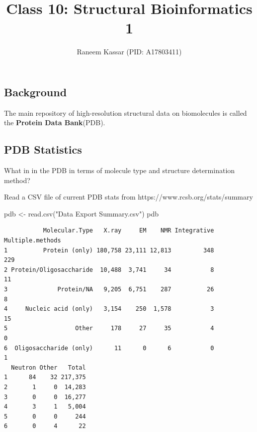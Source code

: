 \documentclass[
  letterpaper,
  DIV=11,
  numbers=noendperiod]{scrartcl}
\title{Class 10: Structural Bioinformatics 1}
\author{Raneem Kassar (PID: A17803411)}
\date{}
\newenvironment{Shaded}{\begin{snugshade}}{\end{snugshade}}
\newcommand{\FunctionTok}[1]{\textcolor[rgb]{0.28,0.35,0.67}{#1}}
\newcommand{\NormalTok}[1]{\textcolor[rgb]{0.00,0.23,0.31}{#1}}
\newcommand{\OtherTok}[1]{\textcolor[rgb]{0.00,0.23,0.31}{#1}}
\newcommand{\SpecialCharTok}[1]{\textcolor[rgb]{0.37,0.37,0.37}{#1}}
\newcommand{\StringTok}[1]{\textcolor[rgb]{0.13,0.47,0.30}{#1}}
\begin{document}
\maketitle


\subsection{Background}\label{background}

The main repository of high-resolution structural data on biomolecules
is called the \textbf{Protein Data Bank}(PDB).

\subsection{PDB Statistics}\label{pdb-statistics}

What in in the PDB in terms of molecule type and structure determination
method?

Read a CSV file of current PDB stats from
https://www.rcsb.org/stats/summary

\begin{Shaded}
\begin{Highlighting}[]
\NormalTok{pdb }\OtherTok{\textless{}{-}} \FunctionTok{read.csv}\NormalTok{(}\StringTok{"Data Export Summary.csv"}\NormalTok{)}
\NormalTok{pdb }
\end{Highlighting}
\end{Shaded}

\begin{verbatim}
           Molecular.Type   X.ray     EM    NMR Integrative Multiple.methods
1          Protein (only) 180,758 23,111 12,813         348              229
2 Protein/Oligosaccharide  10,488  3,741     34           8               11
3              Protein/NA   9,205  6,751    287          26                8
4     Nucleic acid (only)   3,154    250  1,578           3               15
5                   Other     178     27     35           4                0
6  Oligosaccharide (only)      11      0      6           0                1
  Neutron Other   Total
1      84    32 217,375
2       1     0  14,283
3       0     0  16,277
4       3     1   5,004
5       0     0     244
6       0     4      22
\end{verbatim}

\begin{Shaded}
\end{Shaded}
\end{document}
